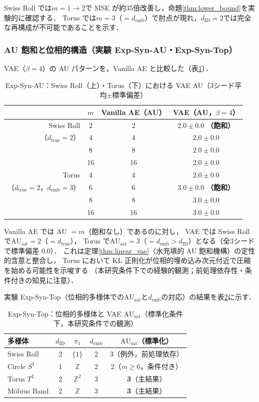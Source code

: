 \documentclass[11pt,a4paper]{jsarticle}
\newcommand{\dID}{d_{\mathrm{ID}}}
\newcommand{\dtrue}{d_{\mathrm{true}}}
\newcommand{\AUsat}{\mathrm{AU}_{\mathrm{sat}}}
\newcommand{\demb}{d_{\mathrm{emb}}}
\begin{document}
Swiss Roll では$m = 1 \to 2$で MSE が約35倍改善し，命題\ref{thm:lower_bound}を実験的に確認する．
Torus では$m = 3$（$= \demb$）で肘点が現れ，$\dID = 2$では完全な再構成が不可能であることを示す．

\subsubsection{AU 飽和と位相的構造（実験 Exp-Syn-AU・Exp-Syn-Top）}

VAE（$\beta = 4$）の AU パターンを，Vanilla AE と比較した（表\ref{tab:ea_summary}）．

\begin{table}[H]
\centering
\caption{Exp-Syn-AU：Swiss Roll（上）・Torus（下）における VAE AU（3シード平均$\pm$標準偏差）}
\label{tab:ea_summary}
\small
\begin{tabular}{rccc}
\toprule
 & $m$ & Vanilla AE（AU） & VAE（AU，$\beta=4$） \\
\midrule
Swiss Roll & 2 & 2 & $2.0\pm0.0$ \textbf{（飽和）} \\
（$\dtrue = 2$） & 4 & 4 & $2.0\pm0.0$ \\
 & 8 & 8 & $2.0\pm0.0$ \\
 & 16 & 16 & $2.0\pm0.0$ \\
\midrule
Torus & 4 & 4 & $2.0\pm0.0$ \\
（$\dtrue = 2$，$\demb = 3$） & 6 & 6 & $3.0\pm0.0$ \textbf{（飽和）} \\
 & 8 & 8 & $3.0\pm0.0$ \\
 & 16 & 16 & $3.0\pm0.0$ \\
\bottomrule
\end{tabular}
\end{table}

Vanilla AE では AU $= m$（飽和なし）であるのに対し，
VAE では Swiss Roll で$\AUsat = 2$（$= \dtrue$），
Torus で$\AUsat = 3$（$= \demb > \dID$）となる（全3シードで標準偏差 0.0）．
これは定理\ref{thm:linear_vae}（水充填的 AU 飽和機構）の定性的含意と整合し，
Torus において KL 正則化が位相的埋め込み次元付近で圧縮を始める可能性を示唆する
（本研究条件下での経験的観測；前処理依存性・条件付きの知見に注意）．

実験 Exp-Syn-Top（位相的多様体での$\AUsat$と$\demb$の対応）の結果を表\ref{tab:eb_summary}に示す．

\begin{table}[H]
\centering
\caption{Exp-Syn-Top：位相的多様体と VAE $\AUsat$（標準化条件下，本研究条件での観測）}
\label{tab:eb_summary}
\small
\begin{tabular}{lcccc}
\toprule
多様体 & $\dID$ & $\pi_1$ & $\demb$ & $\AUsat$（標準化） \\
\midrule
Swiss Roll   & 2 & $\{1\}$        & 2 & 3（例外，前処理依存）\\
Circle $S^1$ & 1 & $\mathbb{Z}$   & 2 & 2（$m \geq 6$，条件付き）\\
Torus $T^2$  & 2 & $\mathbb{Z}^2$ & 3 & \textbf{3}（主結果）\\
Möbius Band  & 2 & $\mathbb{Z}$   & 3 & \textbf{3}（主結果）\\
\bottomrule
\end{tabular}
\end{table}
\end{document}
